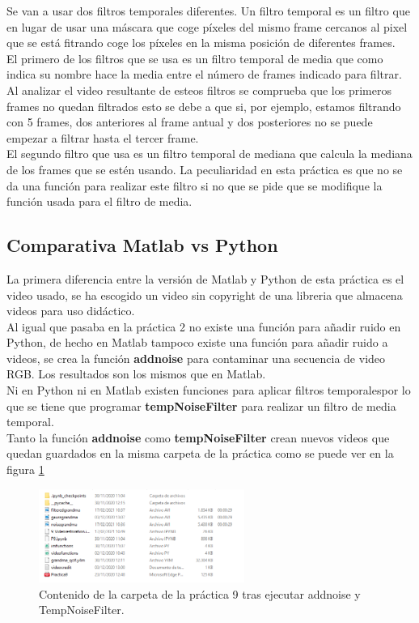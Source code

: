 \documentclass[a4paper,12pt]{report}
\begin{document}
Se van a usar dos filtros temporales diferentes. Un filtro temporal es un filtro que en lugar de usar una máscara que coge píxeles del mismo frame cercanos al pixel que se está fitrando coge los píxeles en la misma posición de diferentes frames.\\

El primero de los filtros que se usa es un filtro temporal de media que como indica su nombre hace la media  entre el número de frames indicado para filtrar. Al analizar el video resultante de esteos filtros se comprueba que los primeros frames no quedan filtrados esto se debe a que si, por ejemplo, estamos filtrando con 5 frames, dos anteriores al frame antual y dos posteriores no se puede empezar a filtrar hasta el tercer frame.\\

El segundo filtro que usa es un filtro temporal de mediana que calcula la mediana de los frames que se estén usando. La peculiaridad en esta práctica es que no se da una función para realizar este filtro si no que se pide que se modifique la función usada para el filtro de media.\\

\subsection{Comparativa Matlab vs Python}

La primera diferencia entre la versión de Matlab y Python de esta práctica es el video usado, se ha escogido un video sin copyright de una libreria que almacena videos para uso didáctico.\\

Al igual que pasaba en la práctica 2 no existe una función para añadir ruido en Python, de hecho en Matlab tampoco existe una función para añadir ruido a videos, se crea la función \textbf{addnoise} para contaminar una secuencia de video RGB. Los resultados son los mismos que en Matlab.\\

Ni en Python ni en Matlab existen funciones para aplicar filtros temporalespor lo que se tiene que programar \textbf{tempNoiseFilter} para realizar un filtro de media temporal.\\ 

Tanto la función \textbf{addnoise} como \textbf{tempNoiseFilter} crean nuevos videos que quedan guardados en la misma carpeta de la práctica como se puede ver en la figura \ref{carpetaP9}

\begin{figure}[h]
\centering
\includegraphics[width=0.6\textwidth]{imagenes/carpetaP9}
\caption{Contenido de la carpeta de la práctica 9 tras ejecutar addnoise y TempNoiseFilter.}
\label{carpetaP9} 
\end{figure}
\end{document}
